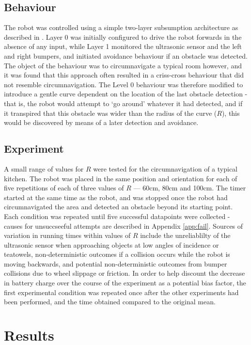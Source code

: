 \documentclass[a4paper,12pt]{article}
\begin{document}
\subsection{Behaviour}
The robot was controlled using a simple two-layer subsumption architecture as described in \citet{BrooksAIJ91}. Layer 0 was initially configured to drive the robot forwards in the absence of any input, while Layer 1 monitored the ultrasonic sensor and the left and right bumpers, and initiated avoidance behaviour if an obstacle was detected. The object of the behaviour was to circumnavigate a typical room however, and it was found that this approach often resulted in a criss-cross behaviour that did not resemble circumnavigation. The Level 0 behaviour was therefore modified to introduce a gentle curve dependent on the location of the last obstacle detection - that is, the robot would attempt to `go around' whatever it had detected, and if it transpired that this obstacle was wider than the radius of the curve ($R$), this would be discovered by means of a later detection and avoidance.

\subsection{Experiment}
A small range of values for $R$ were tested for the circumnavigation of a typical kitchen. The robot was placed in the same position and orientation for each of five repetitions of each of three values of $R$ --- 60cm, 80cm and 100cm. The timer started at the same time as the robot, and was stopped once the robot had circumnavigated the area and detected an obstacle beyond its starting point. Each condition was repeated until five successful datapoints were collected - causes for unsuccseeful attempts are described in Appendix \ref{app:fail}.
Sources of variation in running times within values of $R$ include the unreliablilty of the ultrasonic sensor when approaching objects at low angles of incidence or teatowels, non-deterministic outcomes if a collision occurs while the robot is moving backwards, and potential non-deterministic outcomes from bumper collisions due to wheel slippage or friction. In order to help discount the decrease in battery charge over the course of the experiment as a potential bias factor, the first experimental condition was repeated once after the other experiments had been performed, and the time obtained compared to the original mean.


\section{Results}
\end{document}
